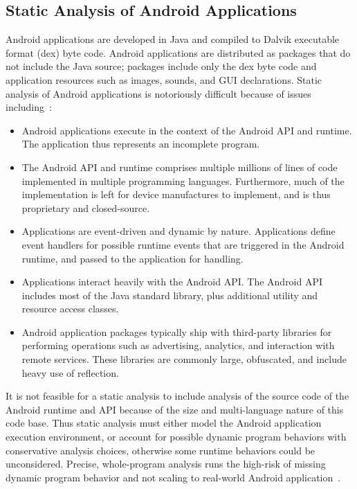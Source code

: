 \subsection{Static Analysis of Android Applications}

Android applications are developed in Java and compiled to Dalvik
executable format (dex) byte code.  Android applications are
distributed as packages that do not include the Java source; packages
include only the dex byte code and application resources such as
images, sounds, and GUI declarations.  Static analysis of Android
applications is notoriously difficult because of issues
including~\cite{Gordon:Kim:Perkins:Gilham:Nguyen:Rinard:NDSS15}:

\begin{itemize}

\item Android applications execute in the context of the Android API
  and runtime.  The application thus represents an incomplete program.
  
\item The Android API and runtime comprises multiple millions of lines of
  code implemented in multiple programming languages.  Furthermore,
  much of the implementation is left for device manufactures to
  implement, and is thus proprietary and closed-source. 

\item Applications are event-driven and dynamic by nature.
  Applications define event handlers for possible runtime events that
  are triggered in the Android runtime, and passed to the application
  for handling. 

\item Applications interact heavily with the Android API.  The Android
  API includes most of the Java standard library, plus additional
  utility and resource access classes.

\item Android application packages typically ship with third-party
  libraries for performing operations such as advertising, analytics,
  and interaction with remote services.  These libraries are commonly
  large, obfuscated, and include heavy use of reflection.

\end{itemize}

It is not feasible for a static analysis to include analysis of the
source code of the Android runtime and API because of the size and
multi-language nature of this code base.  Thus static analysis must
either model the Android application execution environment, or account
for possible dynamic program behaviors with conservative analysis
choices, otherwise some runtime behaviors could be unconsidered.
Precise, whole-program analysis runs the high-risk of missing dynamic
program behavior and not scaling to real-world Android
application~\cite{Gordon:Kim:Perkins:Gilham:Nguyen:Rinard:NDSS15}.

